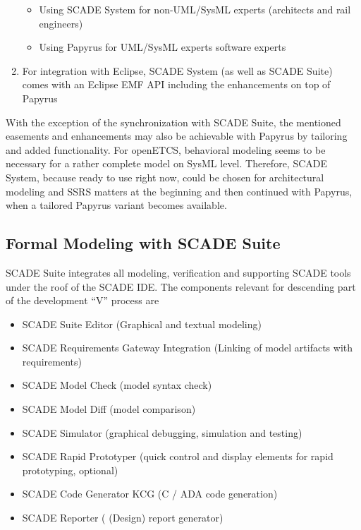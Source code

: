 \begin{enumerate}
	\begin{itemize}
		\item Using SCADE System for non-UML/SysML experts (architects and rail engineers)
		\item Using Papyrus for UML/SysML experts software experts
	\end{itemize}
	
	\item For integration with Eclipse, SCADE System (as well as SCADE Suite) comes with an Eclipse EMF API including the enhancements on top of Papyrus
\end{enumerate}

With the exception of the synchronization with SCADE Suite, the mentioned easements and enhancements may also be achievable with Papyrus by tailoring and added functionality.
For openETCS, behavioral modeling seems to be necessary for a rather complete model on SysML level. 
Therefore, SCADE System, because ready to use right now, could be chosen for architectural modeling and SSRS matters at the beginning and then continued with Papyrus, when a tailored Papyrus variant becomes available.  

\subsection{Formal Modeling with SCADE Suite}
\label{sec:FormalModellingwithSCADESuite}

SCADE Suite integrates all modeling, verification and supporting SCADE tools under the roof of the SCADE IDE. The components relevant for descending part of the development "`V"' process are

\begin{itemize}
	\item SCADE Suite Editor (Graphical and textual modeling)
	\item SCADE Requirements Gateway Integration (Linking of model artifacts with requirements)
	\item SCADE Model Check (model syntax check)
	\item SCADE Model Diff (model comparison)
	\item SCADE Simulator (graphical debugging, simulation and testing) 
	\item SCADE Rapid Prototyper (quick control and display elements for rapid prototyping, optional)
	\item SCADE Code Generator KCG (C / ADA code generation)
	\item SCADE Reporter ( (Design) report generator)
\end{itemize}


